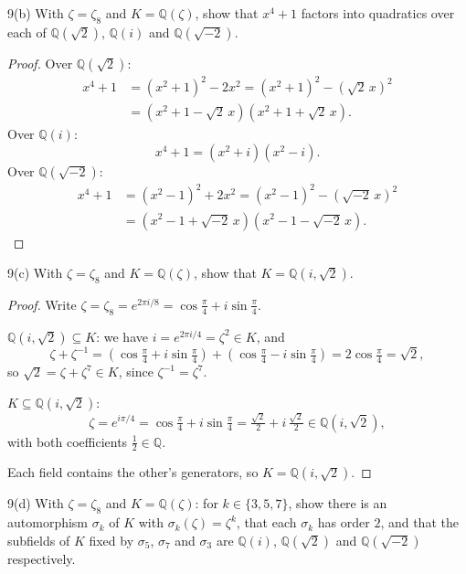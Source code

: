 \documentclass[11pt]{article}
\begin{document}
\begin{problem}{9(b)}
  With $\zeta = \zeta_8$ and $K = \mathbb{Q}(\zeta)$, show that $x^4 + 1$
  factors into quadratics over each of $\mathbb{Q}(\sqrt{2})$, $\mathbb{Q}(i)$
  and $\mathbb{Q}(\sqrt{-2})$.
\end{problem}

\begin{proof}
Over $\mathbb{Q}(\sqrt{2})$:
\begin{align*}
  x^4 + 1 &= (x^2+1)^2 - 2x^2 = (x^2+1)^2 - (\sqrt{2}\,x)^2 \\
          &= (x^2 + 1 - \sqrt{2}\,x)(x^2 + 1 + \sqrt{2}\,x).
\end{align*}
Over $\mathbb{Q}(i)$:
\[
  x^4 + 1 = (x^2 + i)(x^2 - i).
\]
Over $\mathbb{Q}(\sqrt{-2})$:
\begin{align*}
  x^4 + 1 &= (x^2-1)^2 + 2x^2 = (x^2-1)^2 - (\sqrt{-2}\,x)^2 \\
          &= (x^2 - 1 + \sqrt{-2}\,x)(x^2 - 1 - \sqrt{-2}\,x).
\end{align*}
\end{proof}

\begin{problem}{9(c)}
  With $\zeta = \zeta_8$ and $K = \mathbb{Q}(\zeta)$, show that
  $K = \mathbb{Q}(i, \sqrt{2})$.
\end{problem}

\begin{proof}
Write $\zeta = \zeta_8 = e^{2\pi i/8} = \cos\frac{\pi}{4} + i\sin\frac{\pi}{4}$.

$\mathbb{Q}(i,\sqrt{2}) \subseteq K$: we have $i = e^{2\pi i/4} = \zeta^2 \in K$, and
\[
  \zeta + \zeta^{-1} = \left(\cos\tfrac{\pi}{4} + i\sin\tfrac{\pi}{4}\right)
  + \left(\cos\tfrac{\pi}{4} - i\sin\tfrac{\pi}{4}\right)
  = 2\cos\tfrac{\pi}{4} = \sqrt{2},
\]
so $\sqrt{2} = \zeta + \zeta^7 \in K$, since $\zeta^{-1} = \zeta^7$.

$K \subseteq \mathbb{Q}(i,\sqrt{2})$:
\[
  \zeta = e^{i\pi/4} = \cos\tfrac{\pi}{4} + i\sin\tfrac{\pi}{4}
  = \tfrac{\sqrt{2}}{2} + i\,\tfrac{\sqrt{2}}{2} \in \mathbb{Q}(i,\sqrt{2}),
\]
with both coefficients $\tfrac12 \in \mathbb{Q}$.

Each field contains the other's generators, so $K = \mathbb{Q}(i,\sqrt{2})$.
\end{proof}

\begin{problem}{9(d)}
  With $\zeta = \zeta_8$ and $K = \mathbb{Q}(\zeta)$: for $k \in \{3,5,7\}$,
  show there is an automorphism $\sigma_k$ of $K$ with
  $\sigma_k(\zeta) = \zeta^{k}$, that each $\sigma_k$ has order $2$, and that
  the subfields of $K$ fixed by $\sigma_5$, $\sigma_7$ and $\sigma_3$ are
  $\mathbb{Q}(i)$, $\mathbb{Q}(\sqrt{2})$ and $\mathbb{Q}(\sqrt{-2})$
  respectively.
\end{problem}
\end{document}
